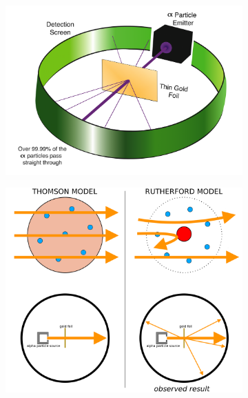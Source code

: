 \documentclass[12pt]{report}
\begin{document}
\begin{figure}[ht]
	\centering
	\begin{subfigure}{0.5\textwidth}
		\centering
		\includegraphics[width=\linewidth]{gold-foil-experiment.png}
	\end{subfigure}%
	\begin{subfigure}{.5\textwidth}
		\centering
		{\includegraphics[width=\linewidth]{assets/atom-model-comparison-answer.png}}

\end{subfigure}
\end{figure}
\end{document}
